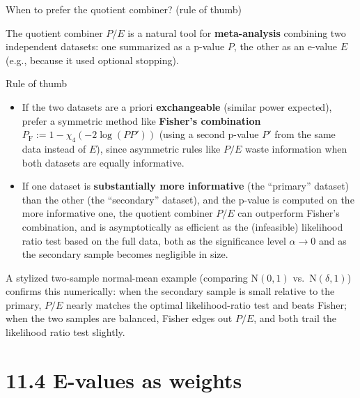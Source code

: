 \documentclass[aspectratio=169,10pt]{beamer}
\newcommand{\1}{\mathbb{1}}
\begin{document}
\begin{frame}[allowframebreaks]{When to prefer the quotient combiner? (rule of thumb)}

The quotient combiner $P/E$ is a natural tool for \textbf{meta-analysis} combining two independent datasets: one summarized as a p-value $P$, the other as an e-value $E$ (e.g., because it used optional stopping).

\begin{block}{Rule of thumb}
\begin{itemize}
\item If the two datasets are a priori \textbf{exchangeable} (similar power expected), prefer a symmetric method like \textbf{Fisher's combination} $P_{\mathrm F} := 1-\chi_4(-2\log(PP'))$ (using a second p-value $P'$ from the same data instead of $E$), since asymmetric rules like $P/E$ waste information when both datasets are equally informative.
\item If one dataset is \textbf{substantially more informative} (the ``primary'' dataset) than the other (the ``secondary'' dataset), and the p-value is computed on the more informative one, the quotient combiner $P/E$ can outperform Fisher's combination, and is asymptotically as efficient as the (infeasible) likelihood ratio test based on the full data, both as the significance level $\alpha\to0$ and as the secondary sample becomes negligible in size.
\end{itemize}
\end{block}

A stylized two-sample normal-mean example (comparing $\mathrm N(0,1)$ vs.\ $\mathrm N(\delta,1)$) confirms this numerically: when the secondary sample is small relative to the primary, $P/E$ nearly matches the optimal likelihood-ratio test and beats Fisher; when the two samples are balanced, Fisher edges out $P/E$, and both trail the likelihood ratio test slightly.

\end{frame}

\section{11.4 E-values as weights}
\end{document}
